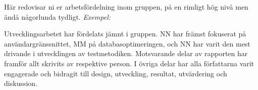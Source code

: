 Här redovisar ni er arbetsfördelning inom gruppen, på en rimligt hög nivå men ändå någorlunda tydligt. \emph{Exempel:}

Utvecklingsarbetet har fördelats jämnt i gruppen. NN har främst fokuserat på användar\-gräns\-snittet, MM på databasoptimeringen, och NN har varit den mest drivande i utvecklingen av testmetodiken. Motsvarande delar av rapporten har framför allt skrivits av respektive person. I övriga delar har alla författarna varit engagerade och bidragit till design, utveckling, resultat, utvärdering och diskussion.
